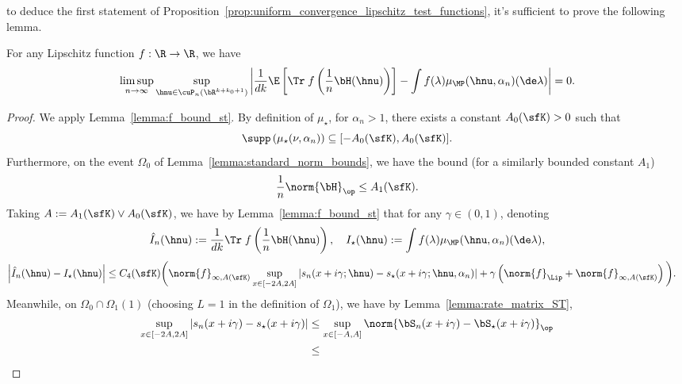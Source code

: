 to deduce the first statement of Proposition~\ref{prop:uniform_convergence_lipschitz_test_functions}, 
it's sufficient to prove the following lemma.
\begin{lemma}
\label{lemma:LP_bound}
For any Lipschitz function $f:\R\to\R$, we have
\begin{equation}
\nonumber
    \limsup_{n\to\infty} \sup_{\hnu\in\cuP_n(\bR^{k+k_0+1})} 
    \left|
    \frac1{dk} \E\left[\Tr\;f \left(\frac1n \bH(\hnu)\right)\right] - \int f(\lambda) \mu_{\MP}(\hnu,\alpha_n)(\de\lambda)\right| = 0.
\end{equation}
\end{lemma}
\begin{proof}
We apply Lemma~\ref{lemma:f_bound_st}.
By definition of $\mu_\star$,  for $\alpha_n >1$, there exists a constant $A_0(\sfK) > 0$ such that
\begin{equation}
\nonumber
    \supp\left(\mu_\star(\nu, \alpha_n)\right) \subseteq [-A_0(\sfK),A_0(\sfK)].
\end{equation}
Furthermore, on the event $\Omega_0$ of Lemma~\ref{lemma:standard_norm_bounds}, we have the bound
(for a similarly bounded constant $A_1$)
\begin{equation}
\nonumber
    \frac1n\norm{\bH}_\op 
    \le A_1(\sfK).
    \end{equation}
%
Taking  $A := A_1(\sfK) \vee A_0(\sfK)$,
we have by Lemma~\ref{lemma:f_bound_st} that 
for any $\gamma \in (0,1)$,
denoting
\begin{equation}
\nonumber
    \hat I_n(\hnu) := 
    \frac1{dk} \Tr\;f \left(\frac1n \bH(\hnu)\right), \quad
    I_\star(\hnu) :=  \int f(\lambda) \mu_{\MP}(\hnu,\alpha_n)(\de\lambda),
\end{equation}
\begin{align*}
\left|
    \hat I_n(\hnu)-  I_\star(\hnu)\right|
&\le C_4(\sfK)
\bigg(
\norm{f}_{\infty,A(\sfK)}
 \sup_{x \in [-2A,2A]}\left|s_n(x + i \gamma;\hnu) - s_\star(x+ i\gamma;\hnu,\alpha_n)\right|+\gamma \left(\norm{f}_{\Lip}  + \norm{f}_{\infty,A(\sfK)}  \right)  \bigg).
\end{align*}
Meanwhile, on $\Omega_0\cap\Omega_1(1)$ (choosing $L=1$ in the definition of $\Omega_1$), we have by Lemma~\ref{lemma:rate_matrix_ST},
\begin{align*}
  \sup_{x\in[-2A,2A]} |s_n(x + i \gamma) - s_\star(x+i\gamma)| &\le 
  \sup_{x\in [-A,A]}\norm{\bS_n(x+i \gamma) - \bS_\star(x + i\gamma)}_\op\\
  &\le

\end{align*}
\end{proof}
